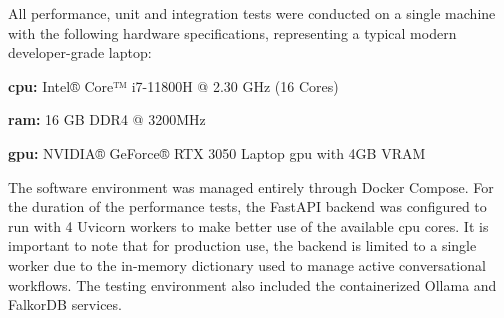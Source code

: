 All performance, unit and integration tests were conducted on a single machine with the following hardware specifications, representing a typical modern developer-grade laptop:
\begin{compactitem}[\textbullet]
    \item \textbf{\acs{cpu}:} Intel® Core™ i7-11800H @ 2.30 GHz (16 Cores)
    \item \textbf{\acs{ram}:} 16 GB DDR4 @ 3200MHz
    \item \textbf{\acs{gpu}:} NVIDIA® GeForce® RTX 3050 Laptop \acs{gpu} with 4GB VRAM
\end{compactitem}

The software environment was managed entirely through Docker Compose. For the duration of the performance tests, the FastAPI backend was configured to run with 4 Uvicorn workers to make better use of the available \acs{cpu} cores. 
It is important to note that for production use, the backend is limited to a single worker due to the in-memory dictionary used to manage active conversational workflows. The testing environment also included the containerized Ollama and FalkorDB services.

